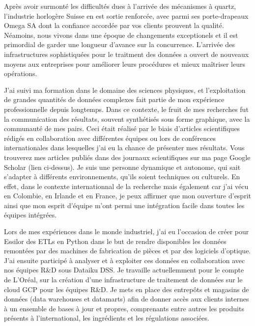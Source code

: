 \documentclass[11pt, a4paper]{awesome-cv}
\begin{document}
\begin{cvletter}
Après avoir surmonté les difficultés dues à l'arrivée des mécanismes à quartz, 
l'industrie horlogère Suisse en est sortie renforcée, avec parmi ses porte-drapeaux Omega SA dont la confiance accordée par vos clients prouvent la qualité. 
Néamoins, nous vivons dans une époque de changements exceptionels et il est primordial de garder une longueur d'avance sur la concurrence. 
L'arrivée des infrastructures sophistiquées pour le traitment des données a ouvert de nouveaux moyens aux entreprises pour améliorer leurs procédures et 
mieux maîtriser leurs opérations.

J'ai suivi ma formation dans le domaine des sciences physiques, et l'exploitation de grandes quantités de données complexes fait partie de mon expérience professionnelle 
depuis longtemps. Dans ce contexte, le fruit de mes recherches fut la communication des résultats, souvent synthétisés sous forme graphique, avec la communauté de mes pairs.
Ceci était réalisé par le biais d'articles scientifiques rédigés en collaboration avec différentes équipes ou lors de conférences internationales dans lesquelles j'ai eu la chance de présenter mes résultats. Vous trouverez mes articles publiés dans des journaux scientifiques sur ma page Google Scholar (lien ci-dessus).
Je suis une personne dynamique et autonome, qui sait s'adapter à différents environnements, qu'ils soient techniques ou culturels. En effet, dans le contexte internationnal de la recherche mais également car j'ai vécu en Colombie, en Irlande et en France, je peux affirmer que mon ouverture d'esprit ainsi que mon esprit d'équipe m'ont permi une intégration facile dans toutes les équipes intégrées. 

Lors de mes expériences dans le monde industriel, j'ai eu l'occasion de créer pour Essilor des ETLs en Python dans le but de rendre disponibles les données remontées par des machines de fabrication de pièces et par des logiciels d'optique. J'ai ensuite participé à analyser et à exploiter ces données en collaboration avec nos équipes R\&D sous Dataiku DSS. Je travaille actuellemment pour le compte de L'Oréal, sur la création d'une infrastructure de traitement de données sur le cloud GCP pour les équipes R\&D. Je mets en place des entrepôts et magasins de données (data warehouses et datamarts) afin de donner accès aux clients internes à un ensemble de bases à jour et propres, comprenants entre autres les produits présents à l'international, les ingrédients et les régulations associées. 

\begin{comment}
My job consisted of \underline{creating ETLs} written in python which 
handled data from the company's fabrication machines and optical calculators. These data were then made available through the Amazon cloud and analyzed 
using Dataiku DSS. My current project at L'Oréal has brought me \underline{to work on the construction of a data infrastructure} to handle the needs of the R\&D teams, 
thus it has been paramount to construct datawarehouses and datamarts to give users access to up to data information on things like worldwide products, ingredients, 
regulations


\end{comment}
\end{cvletter}
\end{document}
